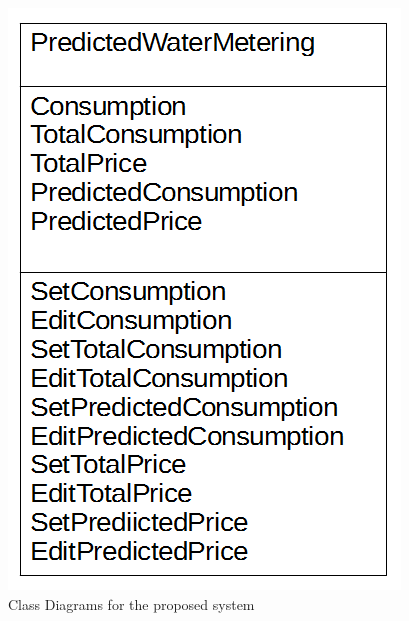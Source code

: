 \begin{figure}[H]
    \includegraphics[width=\textwidth]{./PredictedWaterMetering.png}
    \caption{Class Diagrams for the proposed system} \label{fig:PredictedWaterMetering Class Diagram}
\end{figure}
